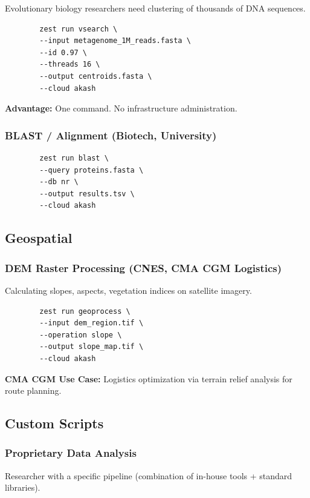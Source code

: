 \documentclass[11pt,a4paper]{article}
\begin{document}
	Evolutionary biology researchers need clustering of thousands of DNA sequences.
	
	\begin{lstlisting}
		zest run vsearch \
		--input metagenome_1M_reads.fasta \
		--id 0.97 \
		--threads 16 \
		--output centroids.fasta \
		--cloud akash
	\end{lstlisting}
	
	\textbf{Advantage:} One command. No infrastructure administration.
	
	\subsubsection{BLAST / Alignment (Biotech, University)}
	
	\begin{lstlisting}
		zest run blast \
		--query proteins.fasta \
		--db nr \
		--output results.tsv \
		--cloud akash
	\end{lstlisting}
	
	\subsection{Geospatial}
	
	\subsubsection{DEM Raster Processing (CNES, CMA CGM Logistics)}
	
	Calculating slopes, aspects, vegetation indices on satellite imagery.
	
	\begin{lstlisting}
		zest run geoprocess \
		--input dem_region.tif \
		--operation slope \
		--output slope_map.tif \
		--cloud akash
	\end{lstlisting}
	
	\textbf{CMA CGM Use Case:} Logistics optimization via terrain relief analysis for route planning.
	
	\subsection{Custom Scripts}
	
	\subsubsection{Proprietary Data Analysis}
	
	Researcher with a specific pipeline (combination of in-house tools + standard libraries).
	
\end{document}
